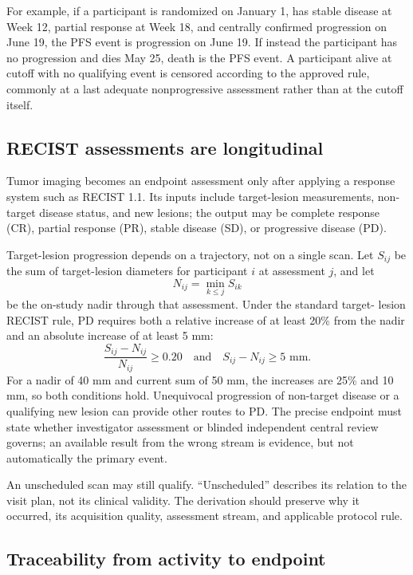 \documentclass[12pt,oneside]{book}
\numberwithin{equation}{section}
\theoremstyle{definition}
\theoremstyle{plain}
\theoremstyle{remark}
\begin{document}
For example, if a participant is randomized on January 1, has stable disease
at Week 12, partial response at Week 18, and centrally confirmed progression on
June 19, the PFS event is progression on June 19.  If instead the participant
has no progression and dies May 25, death is the PFS event.  A participant
alive at cutoff with no qualifying event is censored according to the approved
rule, commonly at a last adequate nonprogressive assessment rather than at the
cutoff itself.

\subsection{RECIST assessments are longitudinal}

Tumor imaging becomes an endpoint assessment only after applying a response
system such as RECIST 1.1.  Its inputs include target-lesion measurements,
non-target disease status, and new lesions; the output may be complete response
(CR), partial response (PR), stable disease (SD), or progressive disease (PD).

Target-lesion progression depends on a trajectory, not on a single scan.  Let
$S_{ij}$ be the sum of target-lesion diameters for participant $i$ at assessment
$j$, and let
\[
  N_{ij}=\min_{k\le j}S_{ik}
\]
be the on-study nadir through that assessment.  Under the standard target-
lesion RECIST rule, PD requires both a relative increase of at least 20\% from
the nadir and an absolute increase of at least 5 mm:
\[
  \frac{S_{ij}-N_{ij}}{N_{ij}}\ge 0.20
  \quad\text{and}\quad
  S_{ij}-N_{ij}\ge 5\text{ mm}.
\]
For a nadir of 40 mm and current sum of 50 mm, the increases are 25\% and
10 mm, so both conditions hold.  Unequivocal progression of non-target disease
or a qualifying new lesion can provide other routes to PD.  The precise
endpoint must state whether investigator assessment or blinded independent
central review governs; an available result from the wrong stream is evidence,
but not automatically the primary event.

An unscheduled scan may still qualify.  ``Unscheduled'' describes its relation
to the visit plan, not its clinical validity.  The derivation should preserve
why it occurred, its acquisition quality, assessment stream, and applicable
protocol rule.

\subsection{Traceability from activity to endpoint}
\end{document}
